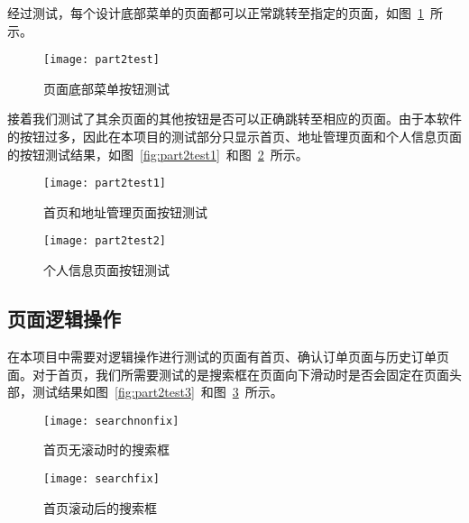 经过测试，每个设计底部菜单的页面都可以正常跳转至指定的页面，如图~\ref{fig:part2test}~所示。
\begin{figure}[htbp]
    \centering
    \texttt{[image: part2test]}
    \caption{页面底部菜单按钮测试}\label{fig:part2test}
    \vspace{\baselineskip}
\end{figure}

接着我们测试了其余页面的其他按钮是否可以正确跳转至相应的页面。由于本软件的按钮过多，因此在本项目的测试部分只显示首页、地址管理页面和个人信息页面的按钮测试结果，如图~\ref{fig:part2test1}~和图~\ref{fig:part2test2}~所示。
\begin{figure}[htbp]
    \begin{minipage}{0.6\textwidth}
    \centering
    \texttt{[image: part2test1]}
    \caption{首页和地址管理页面按钮测试}\label{fig:part2test1}
    \end{minipage}
    \begin{minipage}{0.5\textwidth}
    \centering
    \texttt{[image: part2test2]}
    \caption{个人信息页面按钮测试}\label{fig:part2test2}
    \end{minipage}
    \vspace{\baselineskip}
\end{figure}

\subsection{页面逻辑操作}
在本项目中需要对逻辑操作进行测试的页面有首页、确认订单页面与历史订单页面。对于首页，我们所需要测试的是搜索框在页面向下滑动时是否会固定在页面头部，测试结果如图~\ref{fig:part2test3}~和图~\ref{fig:part2test4}~所示。
\begin{figure}[htbp]
    \centering
    \begin{minipage}{0.4\textwidth}
    \centering
    \texttt{[image: searchnonfix]}
    \caption{首页无滚动时的搜索框}\label{fig:part2test3}
    \end{minipage}
    \begin{minipage}{0.4\textwidth}
    \centering
    \texttt{[image: searchfix]}
    \caption{首页滚动后的搜索框}\label{fig:part2test4}
    \end{minipage}
    \vspace{\baselineskip}
\end{figure}

